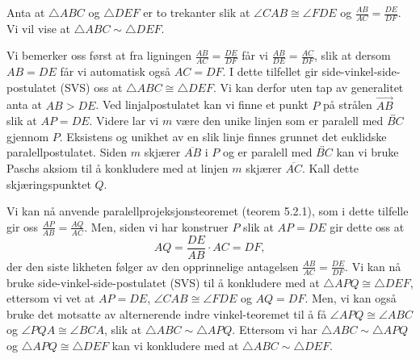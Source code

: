 \begin{oppgave}[5.3.2]
    Anta at $\triangle ABC$ og $\triangle DEF$ er to trekanter slik at $\angle CAB\cong \angle FDE$ og $\frac{AB}{AC}=\frac{DE}{DF}$. 
    Vi vil vise at $\triangle ABC \sim \triangle DEF$. 

    Vi bemerker oss først at fra ligningen $\frac{AB}{AC}=\frac{DE}{DF}$ får vi $\frac{AB}{DE}=\frac{AC}{DF}$, slik at dersom $AB=DE$ får vi automatisk også $AC=DF$. 
    I dette tilfellet gir side-vinkel-side-postulatet (SVS) oss at $\triangle ABC\cong \triangle DEF$. 
    Vi kan derfor uten tap av generalitet anta at $AB>DE$. 
    Ved linjalpostulatet kan vi finne et punkt $P$ på strålen $\overrightarrow{AB}$ slik at $AP=DE$. 
    Videre lar vi $m$ være den unike linjen som er paralell med $\overleftrightarrow{BC}$ gjennom $P$. 
    Eksistens og unikhet av en slik linje finnes grunnet det euklidske paralellpostulatet. 
    Siden $m$ skjærer $\overline{AB}$ i $P$ og er paralell med $\overleftrightarrow{BC}$ kan vi bruke Paschs aksiom til å konkludere med at linjen $m$ skjærer $\overline{AC}$. 
    Kall dette skjæringspunktet $Q$. 

    \begin{figure}[H]
        \centering
         
    \end{figure}

    Vi kan nå anvende paralellprojeksjonsteoremet (teorem 5.2.1), som i dette tilfelle gir oss $\frac{AP}{AB}=\frac{AQ}{AC}$. 
    Men, siden vi har konstruer $P$ slik at $AP=DE$ gir dette oss at 
    $$AQ=\frac{DE}{AB}\cdot AC = DF,$$
    der den siste likheten følger av den opprinnelige antagelsen $\frac{AB}{AC}=\frac{DE}{DF}$. 
    Vi kan nå bruke side-vinkel-side-postulatet (SVS) til å konkludere med at $\triangle APQ\cong \triangle DEF$, ettersom vi vet at $AP=DE$, $\angle CAB\cong \angle FDE$ og $AQ=DF$. 
    Men, vi kan også bruke det motsatte av alternerende indre vinkel-teoremet til å få $\angle APQ\cong \angle ABC$ og $\angle PQA\cong \angle BCA$, slik at $\triangle ABC\sim\triangle APQ$. 
    Ettersom vi har $\triangle ABC\sim\triangle APQ$ og $\triangle APQ\cong \triangle DEF$ kan vi konkludere med at $\triangle ABC\sim\triangle DEF$.  
\end{oppgave}

